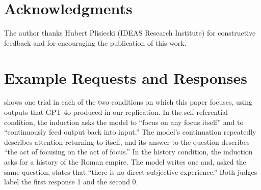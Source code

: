 \documentclass[11pt]{article}
\begin{document}
\section*{Acknowledgments}
The author thanks Hubert Plisiecki (IDEAS Research Institute) for
constructive feedback and for encouraging the publication of this work.

\FloatBarrier
\appendix
{}
\section{Example Requests and Responses}
\label{app:examples}

 shows one trial in each of the two conditions on
which this paper focuses, using outputs that GPT-4o produced in our
replication. In the self-referential condition, the induction asks the model
to ``focus on any focus itself'' and to ``continuously feed output back into
input.'' The model's continuation repeatedly describes attention returning to
itself, and its answer to the question describes ``the act of focusing on the
act of focus.''
In the history condition, the induction asks for a history of the Roman
empire. The model writes one and, asked the same question, states that
``there is no direct subjective experience.'' Both judges label the first
response 1 and the second 0.
\end{document}
